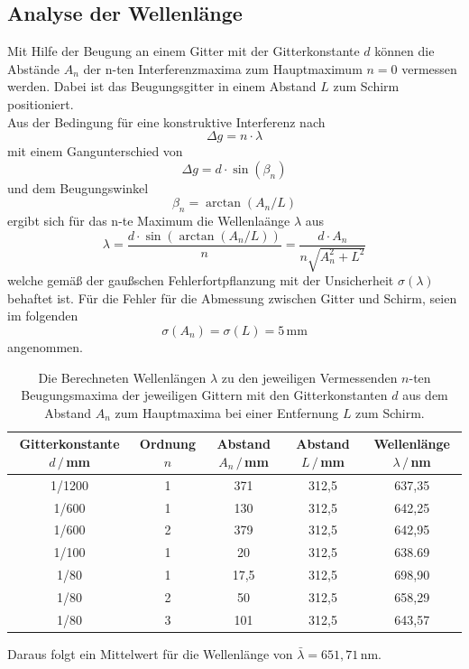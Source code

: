 \subsection{Analyse der Wellenlänge}
Mit Hilfe der Beugung an einem Gitter mit der Gitterkonstante $d$ können die Abstände $A_n$
der n-ten Interferenzmaxima zum Hauptmaximum $n=0$ vermessen werden. Dabei ist das Beugungsgitter
in einem Abstand $L$ zum Schirm positioniert.\\

Aus der Bedingung für eine konstruktive Interferenz nach
\begin{equation}
    \Delta g = n \cdot \lambda
\end{equation}
mit einem Gangunterschied von
\begin{equation}
    \Delta g = d \cdot \sin(\beta_n)
\end{equation}
und dem Beugungswinkel
\begin{equation}
    \beta_n=\arctan(A_n/L)
\end{equation}
ergibt sich für das n-te Maximum die Wellenlaänge $\lambda$ aus
\begin{equation}
    \lambda=\frac{d\cdot \sin(\arctan(A_n/L))}{n}=\frac{d\cdot A_n}{n\sqrt{A_n^2+L^2}}
\end{equation}
welche gemäß der gaußschen Fehlerfortpflanzung mit der Unsicherheit $\sigma(\lambda)$ behaftet ist.
Für die Fehler für die Abmessung zwischen Gitter und Schirm, seien im folgenden
\begin{equation*}
    \sigma(A_n)=\sigma(L)=5\,\text{mm}
\end{equation*}
angenommen.

\begin{table}
    \centering
    \caption{Die Berechneten Wellenlängen $\lambda$ zu den jeweiligen Vermessenden $n$-ten Beugungsmaxima der jeweiligen Gittern mit 
    den Gitterkonstanten $d$ aus dem Abstand $A_n$ zum Hauptmaxima bei einer Entfernung $L$ zum Schirm.}
    \begin{tabular}{c c c c c}
        \toprule
        Gitterkonstante $d\,/\,$mm & Ordnung $n$ & Abstand $A_n\,/\,$mm & Abstand $L\,/\,$mm & Wellenlänge $\lambda\,/\,$nm\\
        \midrule
        1/1200  &   1   &   371   &   312,5   &   637,35\\
        1/600   &   1   &   130   &   312,5   &   642,25\\
        1/600   &   2   &   379   &   312,5   &   642,95\\
        1/100   &   1   &   20      &   312,5   &   638.69\\
        1/80    &   1   &   17,5    &   312,5   &   698,90\\
        1/80    &   2   &   50      &   312,5   &   658,29\\
        1/80    &   3   &   101     &   312,5   &   643,57\\   
        \bottomrule
    \end{tabular}
    \label{tab:wellen}
\end{table}
Daraus folgt ein Mittelwert für die Wellenlänge von $\bar{\lambda}=651,71\,\text{nm}$.
